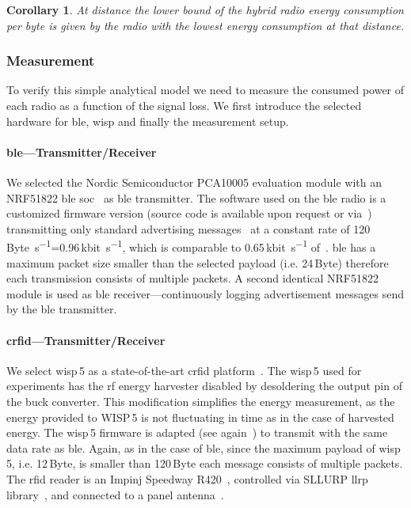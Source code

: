 \documentclass[conference,letterpaper,twoside,final,10pt]{IEEEtran}
\newtheorem{corollary}{Corollary}
\begin{document}
\begin{corollary}
	\label{lemma:minenergy}
	At distance  the lower bound of the hybrid radio energy consumption per byte is given by the radio with the lowest energy consumption at that distance.
\end{corollary}

\subsubsection{Measurement}
\label{sec:measurements}

To verify this simple analytical model we need to measure the consumed power of each radio as a function of the signal loss. We first introduce the selected hardware for \ac{ble}, \ac{wisp} and finally the measurement setup.

\paragraph{\acl{ble}---Transmitter/Receiver}
\label{sec:motivation/ble}

We selected the Nordic Semiconductor PCA10005 evaluation module with an NRF51822 \ac{ble} \ac{soc}~\cite{nordic2012nrf51822} as \ac{ble} transmitter.
The software used on the \ac{ble} radio is a customized firmware version (source code is available upon request or via~\cite{blisp2015repo}) transmitting only standard advertising messages~\cite{ble2015standard} at a constant rate of 120\,\si{Byte\per\second}=0.96\,\si{\kilo bit\per\second}, which is comparable to 0.65\,\si{\kilo bit\per\second} of~\cite[Sec. III-B]{dementyev2013rfid}.
\ac{ble} has a maximum packet size smaller than the selected payload (i.e. 24\,\si{Byte}) therefore each transmission consists of multiple packets.
A second identical NRF51822 module is used as \ac{ble} receiver---continuously logging advertisement messages send by the \ac{ble} transmitter.

\paragraph{\acl{crfid}---Transmitter/Receiver}
\label{sec:motivation/wisp}

We select \ac{wisp}\,5 as a state-of-the-art \ac{crfid} platform~\cite{wiki2015wisp5}.
The \ac{wisp}\,5 used for experiments has the \ac{rf} energy harvester disabled by desoldering the output pin of the buck converter.
This modification simplifies the energy measurement, as the energy provided to WISP\,5 is not fluctuating in time as in the case of harvested energy.
The \ac{wisp}\,5 firmware is adapted (see again~\cite{blisp2015repo}) to transmit with the same data rate as \ac{ble}.
Again, as in the case of \ac{ble}, since the maximum payload of \ac{wisp}\,5, i.e. 12\,\si{Byte}, is smaller than 120\,\si{Byte} each message consists of multiple packets.
The \ac{rfid} reader is an Impinj Speedway R420~\cite{impinj2014r420}, controlled via SLLURP \ac{llrp} library~\cite{github2015sllurp}, and connected to a panel antenna~\cite{laird2015antenna}.
\end{document}
